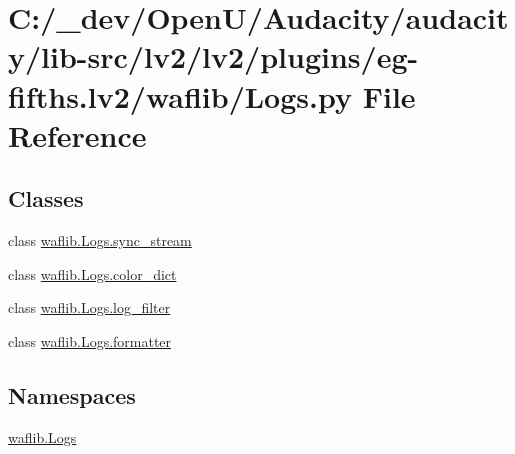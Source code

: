 \hypertarget{lv2_2plugins_2eg-fifths_8lv2_2waflib_2_logs_8py}{}\section{C\+:/\+\_\+dev/\+Open\+U/\+Audacity/audacity/lib-\/src/lv2/lv2/plugins/eg-\/fifths.lv2/waflib/\+Logs.py File Reference}
\label{lv2_2plugins_2eg-fifths_8lv2_2waflib_2_logs_8py}
\subsection*{Classes}
\begin{DoxyCompactItemize}
\item 
class \hyperlink{classwaflib_1_1_logs_1_1sync__stream}{waflib.\+Logs.\+sync\+\_\+stream}
\item 
class \hyperlink{classwaflib_1_1_logs_1_1color__dict}{waflib.\+Logs.\+color\+\_\+dict}
\item 
class \hyperlink{classwaflib_1_1_logs_1_1log__filter}{waflib.\+Logs.\+log\+\_\+filter}
\item 
class \hyperlink{classwaflib_1_1_logs_1_1formatter}{waflib.\+Logs.\+formatter}
\end{DoxyCompactItemize}
\subsection*{Namespaces}
\begin{DoxyCompactItemize}
\item 
 \hyperlink{namespacewaflib_1_1_logs}{waflib.\+Logs}
\end{DoxyCompactItemize}
